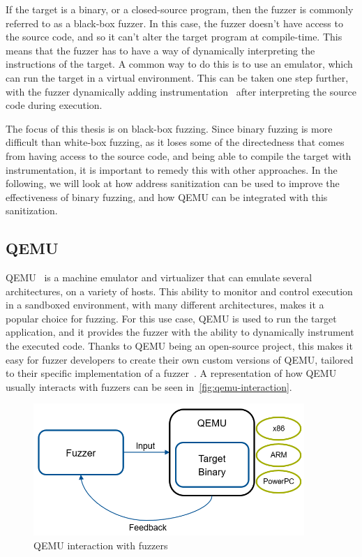 If the target is a binary, or a closed-source program, then the fuzzer is commonly referred to as a black-box fuzzer.
In this case, the fuzzer doesn't have access to the source code, and so it can't alter the target program at
compile-time. This means that the fuzzer has to have a way of dynamically interpreting the instructions of the target.
A common way to do this is to use an emulator, which can run the target in a virtual environment. This can be taken one
step further, with the fuzzer dynamically adding instrumentation~\parencite{CHEN2018118} after interpreting the source code 
during execution.

The focus of this thesis is on black-box fuzzing. Since binary fuzzing is more difficult than white-box fuzzing, as it loses
some of the directedness that comes from having access to the source code, and being able to compile the target with
instrumentation, it is important to remedy this with other approaches. In the following, we will look at how address
sanitization can be used to improve the effectiveness of binary fuzzing, and how QEMU can be integrated with this
sanitization.


\subsection{QEMU}
QEMU~\parencite{269444} is a machine emulator and virtualizer that can emulate several architectures, on a variety of hosts.
This ability to monitor and control execution in a sandboxed environment, with many different architectures, makes it a
popular choice for fuzzing. For this use case, QEMU is used to run the target application, and it provides the fuzzer
with the ability to dynamically instrument the executed code. Thanks to QEMU being an open-source project, this makes it
easy for fuzzer developers to create their own custom versions of QEMU, tailored to their specific implementation of
a fuzzer~\parencite{257204}. A representation of how QEMU usually interacts with fuzzers can be seen
in~\autoref{fig:qemu-interaction}.

\begin{figure}[htpb]
    \centering
    \includegraphics[height=50mm]{figures/qemu_interaction.png}
    \caption[Qemu interaction]{QEMU interaction with fuzzers}\label{fig:qemu-interaction}
\end{figure}

